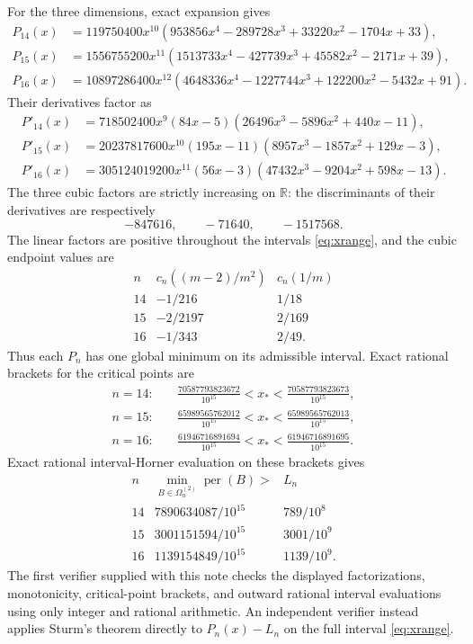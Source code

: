 \documentclass[11pt]{article}
\theoremstyle{remark}
\newcommand{\per}{\operatorname{per}}
\begin{document}
For the three dimensions, exact expansion gives
\begin{align*}
P_{14}(x)&=119750400x^{10}
 (953856x^4-289728x^3+33220x^2-1704x+33),\\
P_{15}(x)&=1556755200x^{11}
 (1513733x^4-427739x^3+45582x^2-2171x+39),\\
P_{16}(x)&=10897286400x^{12}
 (4648336x^4-1227744x^3+122200x^2-5432x+91).
\end{align*}
Their derivatives factor as
\begin{align*}
P'_{14}(x)&=718502400x^9(84x-5)
 (26496x^3-5896x^2+440x-11),\\
P'_{15}(x)&=20237817600x^{10}(195x-11)
 (8957x^3-1857x^2+129x-3),\\
P'_{16}(x)&=305124019200x^{11}(56x-3)
 (47432x^3-9204x^2+598x-13).
\end{align*}
The three cubic factors are strictly increasing on $\mathbb R$: the
discriminants of their derivatives are respectively
\[
 -847616,\qquad -71640,\qquad -1517568.
\]
The linear factors are positive throughout the intervals \eqref{eq:xrange},
and the cubic endpoint values are
\[
\begin{array}{c|cc}
 n&c_n((m-2)/m^2)&c_n(1/m)\\ \hline
14&-1/216&1/18\\
15&-2/2197&2/169\\
16&-1/343&2/49.
\end{array}
\]
Thus each $P_n$ has one global minimum on its admissible interval.  Exact
rational brackets for the critical points are
\begin{align*}
 n=14:&\quad
 \frac{70587793823672}{10^{15}}<x_*<
 \frac{70587793823673}{10^{15}},\\
 n=15:&\quad
 \frac{65989565762012}{10^{15}}<x_*<
 \frac{65989565762013}{10^{15}},\\
 n=16:&\quad
 \frac{61946716891694}{10^{15}}<x_*<
 \frac{61946716891695}{10^{15}}.
\end{align*}
Exact rational interval-Horner evaluation on these brackets gives
\begin{equation}\label{eq:Ln}
 \begin{array}{c|c|c}
 n&\displaystyle \min_{B\in\Omega_n^{(2)}}\per(B)> & L_n\\ \hline
14&7890634087/10^{15}&789/10^8\\
15&3001151594/10^{15}&3001/10^9\\
16&1139154849/10^{15}&1139/10^9.
 \end{array}
\end{equation}
The first verifier supplied with this note checks the displayed
factorizations, monotonicity, critical-point brackets, and outward rational
interval evaluations using only integer and rational arithmetic.  An
independent verifier instead applies Sturm's theorem directly to
$P_n(x)-L_n$ on the full interval \eqref{eq:xrange}.
\end{document}
